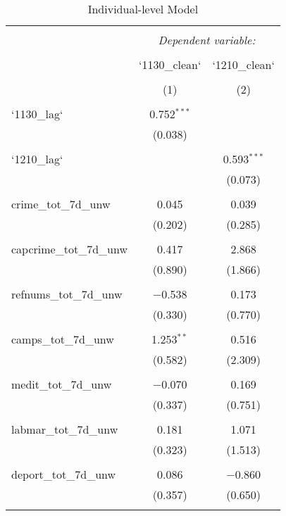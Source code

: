 
\begin{table}[!htbp] \centering 
  \caption{Individual-level Model} 
  \label{} 
\begin{tabular}{@{\extracolsep{5pt}}lcc} 
\\[-1.8ex]\hline 
\hline \\[-1.8ex] 
 & \multicolumn{2}{c}{\textit{Dependent variable:}} \\ 
\cline{2-3} 
\\[-1.8ex] & `1130\_clean` & `1210\_clean` \\ 
\\[-1.8ex] & (1) & (2)\\ 
\hline \\[-1.8ex] 
 `1130\_lag` & 0.752$^{***}$ &  \\ 
  & (0.038) &  \\ 
  & & \\ 
 `1210\_lag` &  & 0.593$^{***}$ \\ 
  &  & (0.073) \\ 
  & & \\ 
 crime\_tot\_7d\_unw & 0.045 & 0.039 \\ 
  & (0.202) & (0.285) \\ 
  & & \\ 
 capcrime\_tot\_7d\_unw & 0.417 & 2.868 \\ 
  & (0.890) & (1.866) \\ 
  & & \\ 
 refnums\_tot\_7d\_unw & $-$0.538 & 0.173 \\ 
  & (0.330) & (0.770) \\ 
  & & \\ 
 camps\_tot\_7d\_unw & 1.253$^{**}$ & 0.516 \\ 
  & (0.582) & (2.309) \\ 
  & & \\ 
 medit\_tot\_7d\_unw & $-$0.070 & 0.169 \\ 
  & (0.337) & (0.751) \\ 
  & & \\ 
 labmar\_tot\_7d\_unw & 0.181 & 1.071 \\ 
  & (0.323) & (1.513) \\ 
  & & \\ 
 deport\_tot\_7d\_unw & 0.086 & $-$0.860 \\ 
  & (0.357) & (0.650) \\ 
  & & \\ 

\end{tabular}
\end{table}
